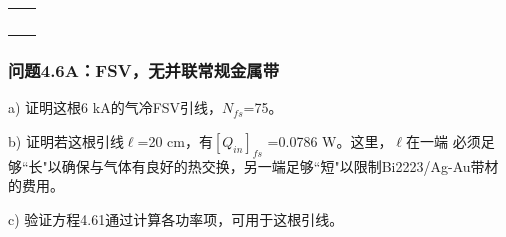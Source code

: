 \begin{table}[htbp]
\begin{tabular}{|l|c|}
		&                                                                                                                                                \\
		&                                                                                                                                                \\
		&                                                                                                                                                \\
		&                                                                                                                                                \\
		&                                                                                                                                                \\ 
\hline
\end{tabular}
\end{table}


\subsubsection{问题4.6A：FSV，无并联常规金属带}

a) 证明这根6 kA的气冷FSV引线，$N_{fs}$=75。

b) 证明若这根引线$\ell$=20 cm，有$[Q_{in}]_{fs}$ =0.0786 W。这里，$\ell$在一端
必须足够``长"以确保与气体有良好的热交换，另一端足够``短"以限制Bi2223/Ag-Au带材的费用。

c) 验证方程4.61通过计算各功率项，可用于这根引线。

